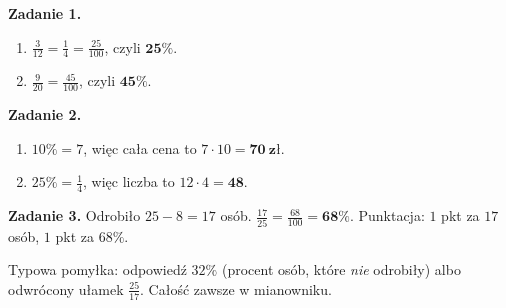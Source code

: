 \documentclass[11pt,a4paper]{article}
\begin{document}

\vspace{0.6em}
\textbf{Zadanie 1.}
\begin{enumerate}[label=\alph*), leftmargin=*, itemsep=4pt]
  \item $\frac{3}{12}=\frac{1}{4}=\frac{25}{100}$, czyli $\mathbf{25\%}$.
  \item $\frac{9}{20}=\frac{45}{100}$, czyli $\mathbf{45\%}$.
\end{enumerate}

\textbf{Zadanie 2.}
\begin{enumerate}[label=\alph*), leftmargin=*, itemsep=4pt]
  \item $10\%=7$, więc cała cena to $7\cdot 10=\mathbf{70\ zł}$.
  \item $25\%=\frac{1}{4}$, więc liczba to $12\cdot 4=\mathbf{48}$.
\end{enumerate}

\textbf{Zadanie 3.} Odrobiło $25-8=17$ osób. $\frac{17}{25}=\frac{68}{100}=\mathbf{68\%}$. Punktacja: $1$ pkt za $17$ osób, $1$ pkt za $68\%$.

\vspace{0.6em}
\begin{tcolorbox}[colback=white, colframe=okres, boxrule=0.6pt, arc=2pt, title=Wskazówka dla Pawła]
Typowa pomyłka: odpowiedź $32\%$ (procent osób, które \emph{nie} odrobiły) albo odwrócony ułamek $\frac{25}{17}$. Całość zawsze w mianowniku.
\end{tcolorbox}
\end{document}
